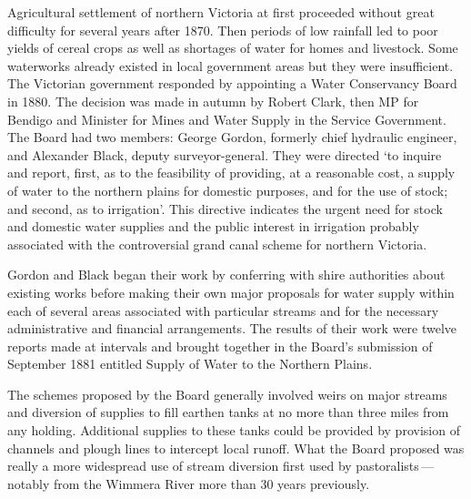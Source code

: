 Agricultural settlement of northern Victoria at first proceeded
without great difficulty for several years after 1870.  Then periods
of low rainfall led to poor yields of cereal crops as well as
shortages of water for homes and livestock.  Some waterworks already
existed in local government areas but they were insufficient.  The
Victorian government responded by appointing a Water Conservancy Board
in 1880.  The decision was made in autumn by Robert Clark,
 then MP for
Bendigo and Minister for Mines and Water Supply in the Service
Government.  The Board had two members: George Gordon,  formerly chief hydraulic engineer, and Alexander Black,
 deputy
surveyor-general.  They were directed `to inquire and report, first,
as to the feasibility of providing, at a reasonable cost, a supply of
water to the northern plains for domestic purposes, and for the use of
stock; and second, as to irrigation'. This directive indicates the
urgent need for stock and domestic water supplies and the public
interest in irrigation probably associated with the controversial
grand canal scheme  for northern
Victoria.

Gordon and Black began their work by conferring with shire authorities
about existing works before making their own major proposals for water
supply within each of several areas associated with particular streams
and for the necessary administrative and financial arrangements.  The
results of their work were twelve reports made at intervals and
brought together in the Board's submission of September 1881 entitled
Supply of Water to the Northern Plains.

The schemes proposed by the Board generally involved weirs on major
streams and diversion of supplies to fill earthen tanks at no more
than three miles from any holding. Additional supplies to these tanks
could be provided by provision of channels and plough lines to
intercept local runoff.  What the Board proposed was really a more
wide\-spread use of stream diversion first used by
pastoralists\,---\,notably from the Wimmera River
 more than 30 years
previously.

